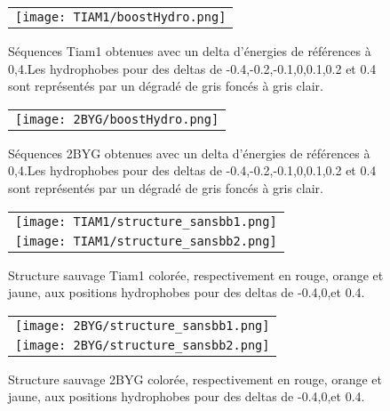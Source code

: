     \clearpage

   \begin{figure}[t]
     \centering
     \begin{tabular}{c}
       \texttt{[image: TIAM1/boostHydro.png]} \\
     \end{tabular}
     \caption{Séquences Tiam1 obtenues avec un delta d'énergies de références à 0,4.Les hydrophobes pour des deltas de -0.4,-0.2,-0.1,0,0.1,0.2 et 0.4 sont représentés par un dégradé de gris foncés à gris clair.}
\label{result:PDZ_seed}
   \end{figure}

    \clearpage

   \begin{figure}[t]
     \centering
     \begin{tabular}{c}
       \texttt{[image: 2BYG/boostHydro.png]} \\
     \end{tabular}
     \caption{Séquences 2BYG obtenues avec un delta d'énergies de références à 0,4.Les hydrophobes pour des deltas de -0.4,-0.2,-0.1,0,0.1,0.2 et 0.4 sont représentés par un dégradé de gris foncés à gris clair.}
\label{result:PDZ_seed}
   \end{figure}


    \clearpage

   \begin{figure}[t]
     \centering
     \begin{tabular}{c}
       \texttt{[image: TIAM1/structure\_sansbb1.png]} \\
       \texttt{[image: TIAM1/structure\_sansbb2.png]} \\
     \end{tabular}
     \caption{Structure sauvage Tiam1 colorée, respectivement en rouge, orange et jaune, aux positions hydrophobes  pour des deltas de -0.4,0,et 0.4.}
\label{result:PDZ_seed}
   \end{figure}

    \clearpage

   \begin{figure}[t]
     \centering
     \begin{tabular}{c}
       \texttt{[image: 2BYG/structure\_sansbb1.png]} \\
       \texttt{[image: 2BYG/structure\_sansbb2.png]} \\
     \end{tabular}
     \caption{Structure sauvage 2BYG colorée, respectivement en rouge, orange et jaune, aux positions hydrophobes  pour des deltas de -0.4,0,et 0.4.}
\label{result:PDZ_seed}
   \end{figure}





